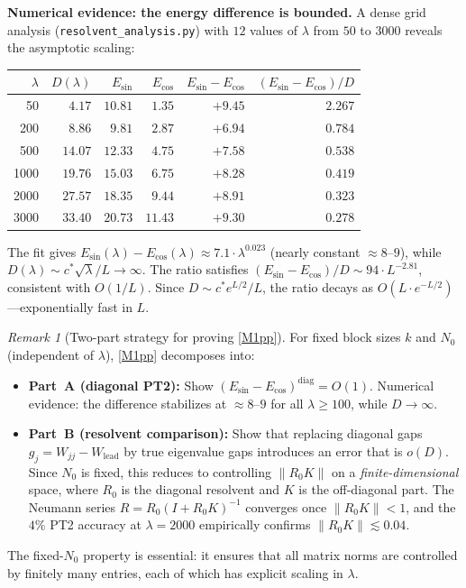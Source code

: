 \documentclass[12pt,a4paper]{article}
\theoremstyle{definition}
\theoremstyle{remark}
\newtheorem{remark}[theorem]{Remark}
\begin{document}
\noindent\textbf{Numerical evidence: the energy difference is bounded.} A dense grid analysis (\texttt{resolvent\_analysis.py}) with $12$ values of $\lambda$ from $50$ to $3000$ reveals the asymptotic scaling:

\begin{center}
\renewcommand{\arraystretch}{1.15}
\begin{tabular}{r|r|r|r|r|r}
$\lambda$ & $D(\lambda)$ & $E_{\sin}$ & $E_{\cos}$ & $E_{\sin}-E_{\cos}$ & $(E_{\sin}-E_{\cos})/D$ \\\hline
50   & $4.17$  & $10.81$ & $1.35$ & $+9.45$ & $2.267$ \\
200  & $8.86$  & $9.81$  & $2.87$ & $+6.94$ & $0.784$ \\
500  & $14.07$ & $12.33$ & $4.75$ & $+7.58$ & $0.538$ \\
1000 & $19.76$ & $15.03$ & $6.75$ & $+8.28$ & $0.419$ \\
2000 & $27.57$ & $18.35$ & $9.44$ & $+8.91$ & $0.323$ \\
3000 & $33.40$ & $20.73$ & $11.43$ & $+9.30$ & $0.278$
\end{tabular}
\end{center}

\noindent The fit gives $E_{\sin}(\lambda) - E_{\cos}(\lambda) \approx 7.1\cdot\lambda^{0.023}$ (nearly constant $\approx 8$--$9$), while $D(\lambda) \sim c^*\sqrt{\lambda}/L \to \infty$. The ratio satisfies $(E_{\sin} - E_{\cos})/D \sim 94\cdot L^{-2.81}$, consistent with $O(1/L)$. Since $D \sim c^* e^{L/2}/L$, the ratio decays as $O(L\cdot e^{-L/2})$---exponentially fast in $L$.

\begin{remark}[Two-part strategy for proving \ref{M1pp}]
\label{rem:two-parts}
For fixed block sizes $k$ and $N_0$ (independent of $\lambda$), \ref{M1pp} decomposes into:
\begin{itemize}
  \item \textbf{Part~A (diagonal PT2):} Show $(E_{\sin} - E_{\cos})^{\mathrm{diag}} = O(1)$. Numerical evidence: the difference stabilizes at $\approx 8$--$9$ for all $\lambda \geq 100$, while $D \to \infty$.
  \item \textbf{Part~B (resolvent comparison):} Show that replacing diagonal gaps $g_j = W_{jj} - W_{\mathrm{lead}}$ by true eigenvalue gaps introduces an error that is $o(D)$. Since $N_0$ is fixed, this reduces to controlling $\|R_0 K\|$ on a \emph{finite-dimensional} space, where $R_0$ is the diagonal resolvent and $K$ is the off-diagonal part. The Neumann series $R = R_0(I + R_0 K)^{-1}$ converges once $\|R_0 K\| < 1$, and the $4\%$ PT2 accuracy at $\lambda = 2000$ empirically confirms $\|R_0 K\| \lesssim 0.04$.
\end{itemize}
The fixed-$N_0$ property is essential: it ensures that all matrix norms are controlled by finitely many entries, each of which has explicit scaling in $\lambda$.
\end{remark}
\end{document}
